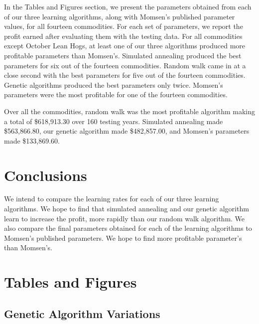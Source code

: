 \documentclass[12pt]{article}
\begin{document}
In the Tables and Figures section, we present the parameters obtained from each
of our three learning algorithms, along with Momsen's published parameter
values, for all fourteen commodities. For each set of parameters, we report the
profit earned after evaluating them with the testing data.  For all commodities
except October Lean Hogs, at least one of our three algorithms produced more
profitable parameters than Momsen's. Simulated annealing produced the best
parameters for six out of the fourteen commodities.  Random walk came in at a
close second with the best parameters for five out of the fourteen commodities.
Genetic algorithms produced the best parameters only twice.  Momsen's parameters
were the most profitable for one of the fourteen commodities.

Over all the commodities, random walk was the most profitable algorithm making a
total of \$618,913.30 over 160 testing years.  Simulated annealing made
\$563,866.80, our genetic algorithm made \$482,857.00, and Momsen's parameters
made \$133,869.60.

\section{Conclusions}

We intend to compare the learning rates for each of our three learning
algorithms. We hope to find that simulated annealing and our genetic algorithm
learn to increase the profit, more rapidly than our random walk algorithm. We
also compare the final parameters obtained for each of the learning algorithms
to Momsen's published parameters. We hope to find more profitable parameter's
than Momsen's.

\pagebreak
\section{Tables and Figures}

\subsection{Genetic Algorithm Variations}
\end{document}
